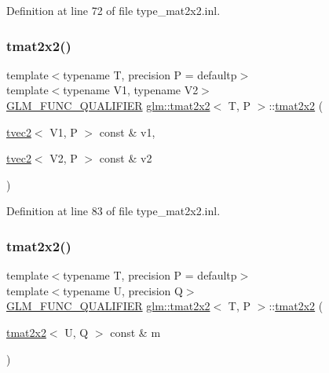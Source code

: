 Definition at line 72 of file type\+\_\+mat2x2.\+inl.

\mbox{\label{structglm_1_1tmat2x2_a62395ad6e9a11a42689e7cc9ee3b6302}} 
\subsubsection{\texorpdfstring{tmat2x2()}{tmat2x2()}\hspace{0.1cm}{\footnotesize\ttfamily [21/22]}}
{\footnotesize\ttfamily template$<$typename T, precision P = defaultp$>$ \\
template$<$typename V1, typename V2$>$ \\
\mbox{\hyperlink{setup_8hpp_a33fdea6f91c5f834105f7415e2a64407}{G\+L\+M\+\_\+\+F\+U\+N\+C\+\_\+\+Q\+U\+A\+L\+I\+F\+I\+ER}} \mbox{\hyperlink{structglm_1_1tmat2x2}{glm\+::tmat2x2}}$<$ T, P $>$\+::\mbox{\hyperlink{structglm_1_1tmat2x2}{tmat2x2}} (\begin{DoxyParamCaption}\item[{\mbox{\hyperlink{structglm_1_1tvec2}{tvec2}}$<$ V1, P $>$ const \&}]{v1,  }\item[{\mbox{\hyperlink{structglm_1_1tvec2}{tvec2}}$<$ V2, P $>$ const \&}]{v2 }\end{DoxyParamCaption})}



Definition at line 83 of file type\+\_\+mat2x2.\+inl.

\mbox{\label{structglm_1_1tmat2x2_a2441e71c7648e358d5e65f2d21ed123a}} 
\subsubsection{\texorpdfstring{tmat2x2()}{tmat2x2()}\hspace{0.1cm}{\footnotesize\ttfamily [22/22]}}
{\footnotesize\ttfamily template$<$typename T, precision P = defaultp$>$ \\
template$<$typename U, precision Q$>$ \\
\mbox{\hyperlink{setup_8hpp_a33fdea6f91c5f834105f7415e2a64407}{G\+L\+M\+\_\+\+F\+U\+N\+C\+\_\+\+Q\+U\+A\+L\+I\+F\+I\+ER}} \mbox{\hyperlink{structglm_1_1tmat2x2}{glm\+::tmat2x2}}$<$ T, P $>$\+::\mbox{\hyperlink{structglm_1_1tmat2x2}{tmat2x2}} (\begin{DoxyParamCaption}\item[{\mbox{\hyperlink{structglm_1_1tmat2x2}{tmat2x2}}$<$ U, Q $>$ const \&}]{m }\end{DoxyParamCaption})}



